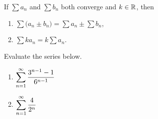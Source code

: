 \newpage

\begin{theorem}
If $\sum a_n$ and $\sum b_n$ both converge and $k\in\mathbb R$, then
\begin{enumerate}
\item $\sum \big(a_n\pm b_n\big) = \sum a_n \pm \sum b_n$,
\item $\sum ka_n = k\sum a_n$.
\end{enumerate}
\end{theorem}

\begin{example}
Evaluate the series below.
\begin{enumerate}
\item $\displaystyle\sum_{n=1}^\infty \frac{3^{n-1} - 1}{6^{n-1}}$
\vfill
\item $\displaystyle\sum_{n=1}^\infty \frac{4}{2^n}$
\vfill
\end{enumerate}
\end{example}
